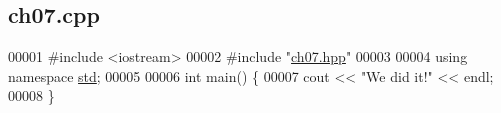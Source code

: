 \hypertarget{ch07_8cpp_source}{}\subsection{ch07.\+cpp}

\begin{DoxyCode}
00001 \textcolor{preprocessor}{#include <iostream>}
00002 \textcolor{preprocessor}{#include "\hyperlink{ch07_8hpp}{ch07.hpp}"}
00003 
00004 \textcolor{keyword}{using namespace }\hyperlink{namespacestd}{std};
00005 
00006 \textcolor{keywordtype}{int} main() \{
00007   cout << \textcolor{stringliteral}{"We did it!"} << endl;
00008 \}
\end{DoxyCode}
